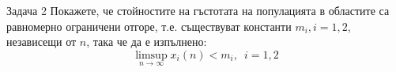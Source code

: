 \begin{frame}[t]{Задача 2}
Покажете, че стойностите на гъстотата на популацията в областите са равномерно ограничени отгоре, т.е. съществуват константи $m_{i}, i = 1, 2$, независещи
от $n$, така че да е изпълнено:
\[
\limsup\limits_{n \to \infty}x_{i}(n)<m_{i}, \enspace i=1,2
\]
\end{frame}

